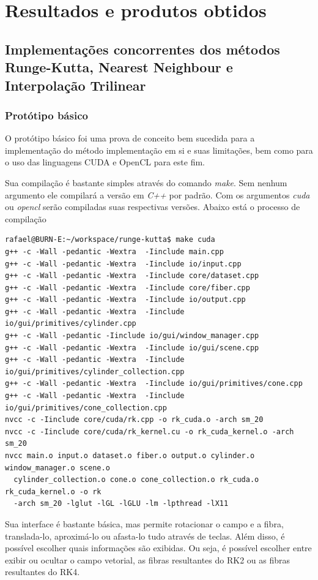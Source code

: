 \chapter{Resultados e produtos obtidos}

\section{Implementações concorrentes dos métodos Runge-Kutta, Nearest Neighbour e Interpolação Trilinear}
  \subsection{Protótipo básico}
  O protótipo básico foi uma prova de conceito bem sucedida para a implementação do método implementação em si e suas limitações, bem como para o uso das linguagens CUDA e OpenCL para este fim.
  
  Sua compilação é bastante simples através do comando \textit{make}. Sem nenhum argumento ele compilará a versão em \textit{C++} por padrão. Com os argumentos \textit{cuda} ou \textit{opencl} serão compiladas suas respectivas versões. Abaixo está o processo de compilação
  
  {\scriptsize
  \begin{verbatim}
rafael@BURN-E:~/workspace/runge-kutta$ make cuda
g++ -c -Wall -pedantic -Wextra  -Iinclude main.cpp
g++ -c -Wall -pedantic -Wextra  -Iinclude io/input.cpp
g++ -c -Wall -pedantic -Wextra  -Iinclude core/dataset.cpp
g++ -c -Wall -pedantic -Wextra  -Iinclude core/fiber.cpp
g++ -c -Wall -pedantic -Wextra  -Iinclude io/output.cpp
g++ -c -Wall -pedantic -Wextra  -Iinclude io/gui/primitives/cylinder.cpp
g++ -c -Wall -pedantic -Iinclude io/gui/window_manager.cpp
g++ -c -Wall -pedantic -Wextra  -Iinclude io/gui/scene.cpp
g++ -c -Wall -pedantic -Wextra  -Iinclude io/gui/primitives/cylinder_collection.cpp
g++ -c -Wall -pedantic -Wextra  -Iinclude io/gui/primitives/cone.cpp
g++ -c -Wall -pedantic -Wextra  -Iinclude io/gui/primitives/cone_collection.cpp
nvcc -c -Iinclude core/cuda/rk.cpp -o rk_cuda.o -arch sm_20
nvcc -c -Iinclude core/cuda/rk_kernel.cu -o rk_cuda_kernel.o -arch sm_20
nvcc main.o input.o dataset.o fiber.o output.o cylinder.o window_manager.o scene.o
  cylinder_collection.o cone.o cone_collection.o rk_cuda.o rk_cuda_kernel.o -o rk
  -arch sm_20 -lglut -lGL -lGLU -lm -lpthread -lX11
  \end{verbatim}
  }
  
  \newpage
  Sua interface é bastante básica, mas permite rotacionar o campo e a fibra, translada-lo, aproximá-lo ou afasta-lo tudo através de teclas. Além disso, é possível escolher quais informações são exibidas. Ou seja, é possível escolher entre exibir ou ocultar o campo vetorial, as fibras resultantes do RK2 ou as fibras resultantes do RK4.
  
